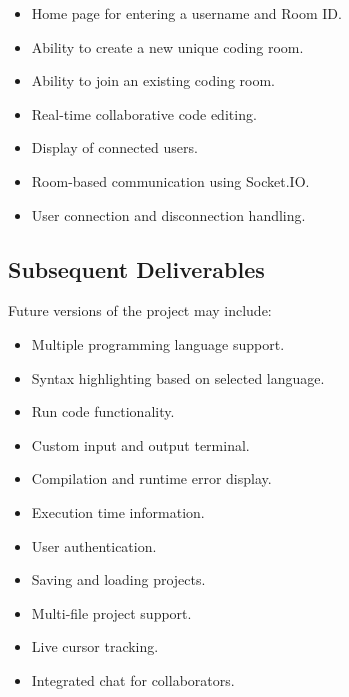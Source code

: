 \documentclass[11pt,letterpaper]{article}
\begin{document}
\begin{itemize}
    \item Home page for entering a username and Room ID.
    
    \item Ability to create a new unique coding room.
    
    \item Ability to join an existing coding room.
    
    \item Real-time collaborative code editing.
    
    \item Display of connected users.
    
    \item Room-based communication using Socket.IO.
    
    \item User connection and disconnection handling.
\end{itemize}


\subsection{Subsequent Deliverables}

Future versions of the project may include:

\begin{itemize}
    \item Multiple programming language support.
    
    \item Syntax highlighting based on selected language.
    
    \item Run code functionality.
    
    \item Custom input and output terminal.
    
    \item Compilation and runtime error display.
    
    \item Execution time information.
    
    \item User authentication.
    
    \item Saving and loading projects.
    
    \item Multi-file project support.
    
    \item Live cursor tracking.
    
    \item Integrated chat for collaborators.
\end{itemize}
\end{document}

